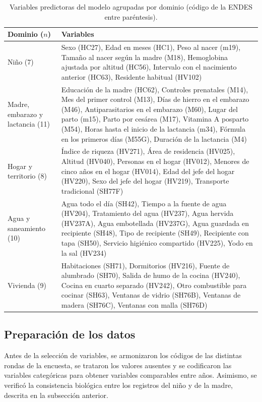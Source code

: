 \documentclass[final,5p,times,twocolumn,number,lefttitle]{elsarticle}
\begin{document}
\begin{table}[!tp]
\centering
\caption{Variables predictoras del modelo agrupadas por dominio (código de la ENDES entre paréntesis).}
\label{tab:variables}
\small
\begin{tabular}{p{}p{}}
\hline
Dominio ($n$) & Variables \\
\hline
Niño (7) & Sexo (HC27), Edad en meses (HC1), Peso al nacer (m19), Tamaño al nacer según la madre (M18), Hemoglobina ajustada por altitud (HC56), Intervalo con el nacimiento anterior (HC63), Residente habitual (HV102) \\
Madre, embarazo y lactancia (11) & Educación de la madre (HC62), Controles prenatales (M14), Mes del primer control (M13), Días de hierro en el embarazo (M46), Antiparasitarios en el embarazo (M60), Lugar del parto (m15), Parto por cesárea (M17), Vitamina A posparto (M54), Horas hasta el inicio de la lactancia (m34), Fórmula en los primeros días (M55G), Duración de la lactancia (M4) \\
Hogar y territorio (8) & Índice de riqueza (HV271), Área de residencia (HV025), Altitud (HV040), Personas en el hogar (HV012), Menores de cinco años en el hogar (HV014), Edad del jefe del hogar (HV220), Sexo del jefe del hogar (HV219), Transporte tradicional (SH77F) \\
Agua y saneamiento (10) & Agua todo el día (SH42), Tiempo a la fuente de agua (HV204), Tratamiento del agua (HV237), Agua hervida (HV237A), Agua embotellada (HV237G), Agua guardada en recipiente (SH48), Tipo de recipiente (SH49), Recipiente con tapa (SH50), Servicio higiénico compartido (HV225), Yodo en la sal (HV234) \\
Vivienda (9) & Habitaciones (SH71), Dormitorios (HV216), Fuente de alumbrado (SH70), Salida de humo de la cocina (HV240), Cocina en cuarto separado (HV242), Otro combustible para cocinar (SH63), Ventanas de vidrio (SH76B), Ventanas de madera (SH76C), Ventanas con malla (SH76D) \\
\hline
\end{tabular}
\end{table}

\subsection{Preparación de los datos}

Antes de la selección de variables, se armonizaron los códigos de las distintas rondas de la encuesta, se trataron los valores ausentes y se codificaron las variables categóricas para obtener variables comparables entre años. Asimismo, se verificó la consistencia biológica entre los registros del niño y de la madre, descrita en la subsección anterior.
\end{document}
